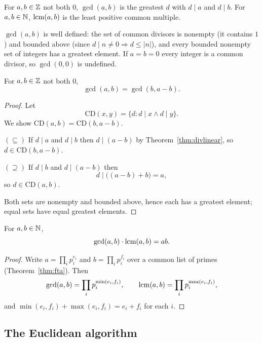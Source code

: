 \documentclass[11pt]{article}
\begin{document}
\begin{definition}
For $a,b\in\mathbb{Z}$ not both $0$, $\gcd(a,b)$ is the greatest $d$ with $d\mid a$ and $d\mid b$. For $a,b\in\mathbb{N}$, $\operatorname{lcm}(a,b)$ is the least positive common multiple.
\end{definition}

\begin{note}
$\gcd(a,b)$ is well defined: the set of common divisors is nonempty (it contains $1$) and bounded above (since $d\mid n\ne0\Rightarrow d\le|n|$), and every bounded nonempty set of integers has a greatest element. If $a=b=0$ every integer is a common divisor, so $\gcd(0,0)$ is undefined.
\end{note}

\begin{theorem}
\label{thm:gcdsub}
For $a,b\in\mathbb{Z}$ not both $0$,
\[
\gcd(a,b)=\gcd(b,a-b).
\]
\end{theorem}

\begin{proof}
Let
\[
\mathrm{CD}(x,y)=\{d : d\mid x \wedge d\mid y\}.
\]
We show $\mathrm{CD}(a,b)=\mathrm{CD}(b,a-b)$.

\medskip
\noindent$(\subseteq)$ If $d\mid a$ and $d\mid b$ then $d\mid(a-b)$ by Theorem~\ref{thm:divlinear}, so $d\in\mathrm{CD}(b,a-b)$.

\medskip
\noindent$(\supseteq)$ If $d\mid b$ and $d\mid(a-b)$ then
\[
d\mid\bigl((a-b)+b\bigr)=a,
\]
so $d\in\mathrm{CD}(a,b)$.

\medskip
\noindent Both sets are nonempty and bounded above, hence each has a greatest element; equal sets have equal greatest elements.
\end{proof}

\begin{theorem}
\label{thm:gcdlcm}
For $a,b\in\mathbb{N}$,
\[
\gcd(a,b)\cdot\operatorname{lcm}(a,b)=ab.
\]
\end{theorem}

\begin{proof}
Write $a=\prod_i p_i^{e_i}$ and $b=\prod_i p_i^{f_i}$ over a common list of primes (Theorem~\ref{thm:fta}). Then
\[
\gcd(a,b)=\prod_i p_i^{\min(e_i,f_i)}, \qquad \operatorname{lcm}(a,b)=\prod_i p_i^{\max(e_i,f_i)},
\]
and $\min(e_i,f_i)+\max(e_i,f_i)=e_i+f_i$ for each $i$.
\end{proof}

\subsection{The Euclidean algorithm}
\end{document}
